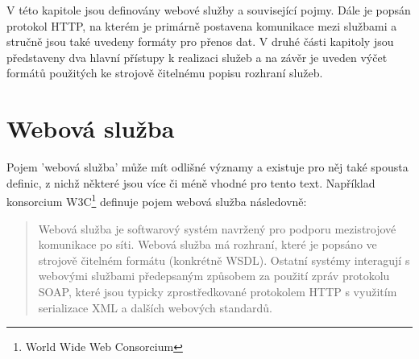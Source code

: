 \documentclass[czech,DP]{thesiskiv}
\begin{document}
V této kapitole jsou definovány webové služby a související pojmy. Dále je popsán protokol HTTP, na kterém je primárně postavena komunikace mezi službami a stručně jsou také uvedeny formáty pro přenos dat. V druhé části kapitoly jsou představeny dva hlavní přístupy k realizaci služeb a na závěr je uveden výčet formátů použitých ke strojově čitelnému popisu rozhraní služeb.

%

\section{Webová služba}




Pojem 'webová služba' může mít odlišné významy\cite{w3cWsDesignIssues} a existuje pro něj také spousta definic, z nichž některé jsou více či méně vhodné pro tento text. Například konsorcium W3C\footnote{World Wide Web Consorcium} definuje pojem webová služba následovně\cite{w3cWsArch}:


\begin{quote}
	Webová služba je softwarový systém navržený pro podporu mezistrojové komunikace po síti. Webová služba má rozhraní, které je popsáno ve strojově čitelném formátu (konkrétně WSDL). Ostatní systémy interagují s webovými službami předepsaným způsobem za použití zpráv protokolu SOAP, které jsou typicky zprostředkované protokolem HTTP s využitím serializace XML a dalších webových standardů.
\end{quote}
\end{document}
